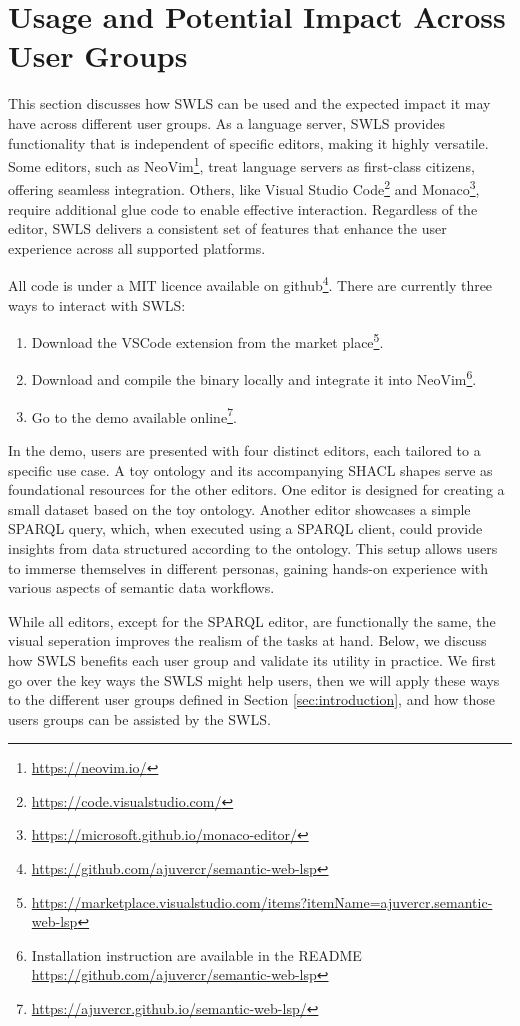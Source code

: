 \section{Usage and Potential Impact Across User Groups}
\label{sec:usage}

This section discusses how SWLS can be used and the expected impact it may have across different user groups.
As a language server, SWLS provides functionality that is independent of specific editors, making it highly versatile.
Some editors, such as NeoVim\footnote{\url{https://neovim.io/}}, treat language servers as first-class citizens, offering seamless integration.
Others, like Visual Studio Code\footnote{\url{https://code.visualstudio.com/}} and Monaco\footnote{\url{https://microsoft.github.io/monaco-editor/}}, require additional glue code to enable effective interaction.
Regardless of the editor, SWLS delivers a consistent set of features that enhance the user experience across all supported platforms.

All code is under a MIT licence available on github\footnote{\url{https://github.com/ajuvercr/semantic-web-lsp}}.
There are currently three ways to interact with SWLS:
\begin{enumerate}
  \item Download the VSCode extension from the market place\footnote{\url{https://marketplace.visualstudio.com/items?itemName=ajuvercr.semantic-web-lsp}}.
  \item Download and compile the binary locally and integrate it into NeoVim\footnote{Installation instruction are available in the README \url{https://github.com/ajuvercr/semantic-web-lsp}}.
  \item Go to the demo available online\footnote{\url{https://ajuvercr.github.io/semantic-web-lsp/}}.
\end{enumerate}

In the demo, users are presented with four distinct editors, each tailored to a specific use case.
A toy ontology and its accompanying SHACL shapes serve as foundational resources for the other editors.
One editor is designed for creating a small dataset based on the toy ontology.
Another editor showcases a simple SPARQL query, which, when executed using a SPARQL client, could provide insights from data structured according to the ontology.
This setup allows users to immerse themselves in different personas, gaining hands-on experience with various aspects of semantic data workflows.

While all editors, except for the SPARQL editor, are functionally the same, 
the visual seperation improves the realism of the tasks at hand.
Below, we discuss how SWLS benefits each user group and validate its utility in practice.
We first go over the key ways the SWLS might help users, then we will apply these ways to the different user groups defined in Section \ref{sec:introduction}, and how those users groups can be assisted by the SWLS.

